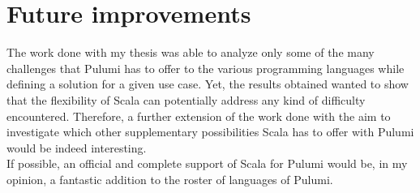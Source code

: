 

\section{Future improvements}
The work done with my thesis was able to analyze only some of the many challenges that Pulumi has to offer to the various programming languages while defining a solution for a given use case.
Yet, the results obtained wanted to show that the flexibility of Scala can potentially address any kind of difficulty encountered.
Therefore, a further extension of the work done with the aim to investigate which other supplementary possibilities Scala has to offer with Pulumi would be indeed interesting.\\
If possible, an official and complete support of Scala for Pulumi would be, in my opinion, a fantastic addition to the roster of languages of Pulumi.

